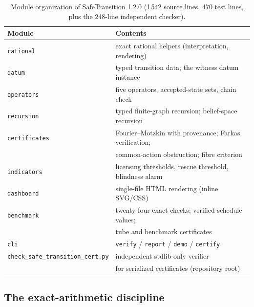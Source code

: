 \documentclass[3p,11pt]{elsarticle}
\begin{document}
\begin{table}[t]
\centering
\small
\begin{tabular}{@{}ll@{}}
\toprule
Module & Contents \\
\midrule
\texttt{rational} & exact rational helpers (interpretation, rendering) \\
\texttt{datum} & typed transition data; the witness datum instance \\
\texttt{operators} & five operators, accepted-state sets, chain check \\
\texttt{recursion} & typed finite-graph recursion; belief-space recursion \\
\texttt{certificates} & Fourier--Motzkin with provenance; Farkas verification; \\
                       & common-action obstruction; fibre criterion \\
\texttt{indicators} & licensing thresholds, rescue threshold, blindness alarm \\
\texttt{dashboard} & single-file HTML rendering (inline SVG/CSS) \\
\texttt{benchmark} & twenty-four exact checks; verified schedule values; \\
                       & tube and benchmark certificates \\
\texttt{cli} & \texttt{verify} / \texttt{report} / \texttt{demo} / \texttt{certify} \\
\texttt{check\_safe\_transition\_cert.py} & independent stdlib-only verifier \\
                       & for serialized certificates (repository root) \\
\bottomrule
\end{tabular}
\caption{Module organization of SafeTransition 1.2.0
(1\,542 source lines, 470 test lines, plus the 248-line independent
checker).}
\label{tab:modules}
\end{table}

\subsection{The exact-arithmetic discipline}\label{sec:exactness}
\end{document}
